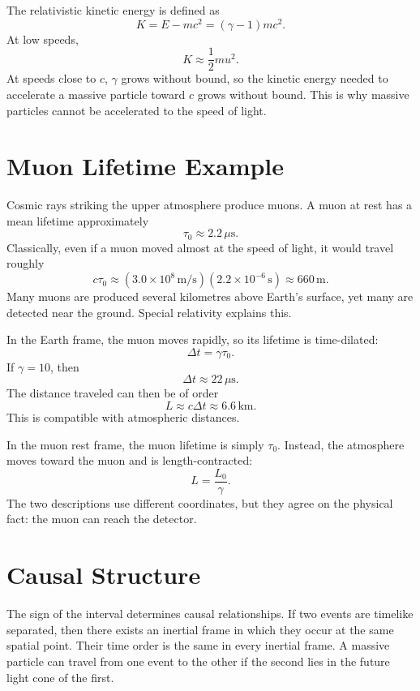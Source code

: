 The relativistic kinetic energy is defined as
\[
K=E-mc^2=(\gamma-1)mc^2.
\]
At low speeds,
\[
K\approx\frac{1}{2}mu^2.
\]
At speeds close to \(c\), \(\gamma\) grows without bound, so the kinetic energy
needed to accelerate a massive particle toward \(c\) grows without bound.
This is why massive particles cannot be accelerated to the speed of light.

\clearpage

\section{Muon Lifetime Example}

Cosmic rays striking the upper atmosphere produce muons.  A muon at rest has a
mean lifetime approximately
\[
\tau_0\approx 2.2\,\mu\mathrm{s}.
\]
Classically, even if a muon moved almost at the speed of light, it would travel
roughly
\[
c\tau_0\approx (3.0\times10^8\,\mathrm{m/s})(2.2\times10^{-6}\,\mathrm{s})
\approx 660\,\mathrm{m}.
\]
Many muons are produced several kilometres above Earth's surface, yet many are
detected near the ground.  Special relativity explains this.

In the Earth frame, the muon moves rapidly, so its lifetime is time-dilated:
\[
\Delta t=\gamma\tau_0.
\]
If \(\gamma=10\), then
\[
\Delta t\approx 22\,\mu\mathrm{s}.
\]
The distance traveled can then be of order
\[
L\approx c\Delta t\approx 6.6\,\mathrm{km}.
\]
This is compatible with atmospheric distances.

In the muon rest frame, the muon lifetime is simply \(\tau_0\).  Instead, the
atmosphere moves toward the muon and is length-contracted:
\[
L=\frac{L_0}{\gamma}.
\]
The two descriptions use different coordinates, but they agree on the physical
fact: the muon can reach the detector.

\begin{center}
\end{center}

\clearpage

\section{Causal Structure}

The sign of the interval determines causal relationships.  If two events are
timelike separated, then there exists an inertial frame in which they occur at
the same spatial point.  Their time order is the same in every inertial frame.
A massive particle can travel from one event to the other if the second lies in
the future light cone of the first.

